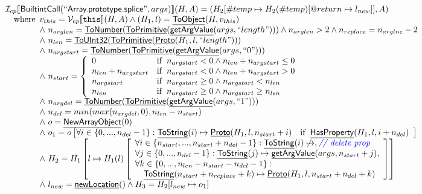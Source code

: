 \documentclass{article}
\makeatletter
\newcommand{\SF}[1]{\mbox{\textsf{#1}}}
\newcommand{\TT}[1]{\mbox{\texttt{#1}}}
\newcommand{\comment}[1]{\textit{#1}}
\newcommand{\wherec}[1]{{\rm where}\begin{array}[t]{l}#1\end{array}}
\newcommand{\ifc}[1]{{\rm if}\begin{array}[t]{l}#1\end{array}}
\newcommand{\I}{\mathcal{I}}
\newcommand{\V}{\mathcal{V}}
\newcommand{\lbr}{\llbracket}
\newcommand{\rbr}{\rrbracket}
\newcommand{\hf}[1]{\underline{\sf #1}}
\newcommand{\varloc}[1]{\##1}
\newcommand{\varprop}[1]{@#1}
\def\inblue{\color{blue}}
\def\inblue{\color{blue}}
\makeatother
\begin{document}
\[
\begin{array}{l}
\I _{cp}\lbr \SF{BuiltintCall}(``\SF{Array.prototype.splice}",args)\rbr(H,A)
 = (H_2[\varloc{temp}\mapsto H_2(\varloc{temp})[\varprop{return}\mapsto l_{new}]], A) \\
\quad\wherec{
  v_{this} = \V _{cp}\lbr \TT{this}\rbr (H,A) \land (H_1,l) = \hf{ToObject}(H,v_{this})\\
  \land\ n_{arglen} = \hf{ToNumber}(\hf{ToPrimitive}(\hf{getArgValue}(args, ``length")))
  \land n_{arglen} > 2 \land n_{replace} = n_{arglne} - 2\\
  \land\ n_{len} = \hf{ToUInt32}(\hf{ToPrimitive}(\hf{Proto}(H_1, l, ``length")))\\
  \land\ n_{argstart} = \hf{ToNumber}(\hf{ToPrimitive}(\hf{getArgValue}(args, ``0")))\\
  \land\ n_{start} = \left\{\begin{array}{ll}
      0 & \ifc{n_{argstart} < 0 \land n_{len} + n_{argstart} \leq 0}\\
      n_{len} + n_{argstart} & \ifc{n_{argstart} < 0 \land n_{len} + n_{argstart} > 0}\\
      n_{argstart} & \ifc{n_{argstart} \geq 0 \land n_{argstart} < n_{len}}\\
      n_{len}  & \ifc{n_{argstart} \geq 0 \land n_{argstart} \geq n_{len}}\\
    \end{array}\right.\\
  \land\ n_{argdel} = \hf{ToNumber}(\hf{ToPrimitive}(\hf{getArgValue}(args, ``1")))\\
  \land\ n_{del} = min(max(n_{argdel}, 0), n_{len} - n_{start})\\
  \land\ o = \hf{NewArrayObject}(0)\\
  \land\ o_1 = o\left[\forall i \in \{0,...,n_{del}-1\}:
    \hf{ToString}(i) \mapsto \hf{Proto}(H_1, l, n_{start}+i)
    \quad\ifc{\hf{HasProperty}(H_1, l, i+n_{del})}\right]\\
  \land\ H_2 = H_1\left[l \mapsto H_1(l)\left[
    \begin{array}{l}
      \forall i \in \{n_{start},...,n_{start}+n_{del}-1\}:\hf{ToString}(i) \not\mapsto,
        \comment{{\inblue // delete prop}}\\
      \forall j \in \{0,...,n_{del}-1\}:\hf{ToString}(j) \mapsto
        \hf{getArgValue}(args, n_{start} + j),\\
      \forall k \in \{0,...,n_{len}-n_{start}-n_{del}-1\}:\\
        \quad\hf{ToString}(n_{start} + n_{replace} + k) \mapsto \hf{Proto}(H_1, l,n_{start} + n_{del} + k)
    \end{array}
    \right]\right]\\
  \land\ l_{new} = \hf{newLocation}() \land H_3 = H_2[l_{new} \mapsto o_1]
  }\\
\\\\



\end{array}
\]
\end{document}
